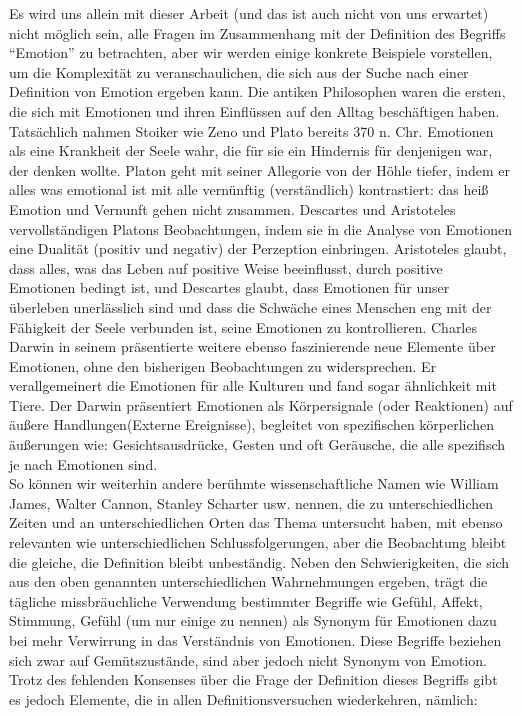 Es wird uns allein mit dieser Arbeit (und das ist auch nicht von uns erwartet) nicht m{\"o}glich sein, alle Fragen im Zusammenhang mit der Definition des Begriffs ``Emotion'' zu betrachten, aber wir werden einige konkrete Beispiele vorstellen, um die Komplexit{\"a}t zu veranschaulichen, die sich aus der Suche nach einer Definition von Emotion ergeben kann.  
Die antiken Philosophen\cite{geslin13} waren die ersten, die sich mit Emotionen und ihren Einfl{\"u}ssen auf den Alltag besch{\"a}ftigen haben. 
Tats{\"a}chlich nahmen Stoiker wie Zeno und Plato bereits 370 n. Chr. Emotionen als eine Krankheit der Seele wahr, die f{\"u}r sie ein Hindernis f{\"u}r denjenigen war, der denken wollte. 
Platon geht mit seiner Allegorie von der H{\"o}hle tiefer, indem er alles was emotional ist  mit alle vern{\"u}nftig (verst{\"a}ndlich) kontrastiert: das hei{\ss} Emotion und Vernunft gehen nicht zusammen. 
Descartes und Aristoteles vervollst{\"a}ndigen Platons Beobachtungen, indem sie in die Analyse von Emotionen eine Dualit{\"a}t (positiv und negativ) der Perzeption einbringen. 
Aristoteles glaubt, dass alles, was das Leben auf positive Weise beeinflusst, durch positive Emotionen bedingt ist, und Descartes glaubt, dass Emotionen f{\"u}r unser {\"u}berleben unerl{\"a}sslich sind und dass die Schw{\"a}che eines Menschen eng mit der F{\"a}higkeit der Seele verbunden ist, seine Emotionen zu kontrollieren. 
Charles Darwin in seinem pr{\"a}sentierte weitere ebenso faszinierende neue Elemente {\"u}ber Emotionen, ohne den bisherigen Beobachtungen zu widersprechen\cite{darwin1872}. 
Er verallgemeinert die Emotionen f{\"u}r alle Kulturen und fand sogar {\"a}hnlichkeit mit Tiere. 
Der Darwin pr{\"a}sentiert  Emotionen  als K{\"o}rpersignale (oder Reaktionen) auf {\"a}u{\ss}ere Handlungen(Externe Ereignisse), begleitet von spezifischen k{\"o}rperlichen {\"a}u{\ss}erungen wie: Gesichtsausdr{\"u}cke, Gesten und oft Ger{\"a}usche, die alle  spezifisch je nach Emotionen sind. \\


So k{\"o}nnen wir weiterhin andere ber{\"u}hmte wissenschaftliche Namen wie William James\cite{james1884}, Walter Cannon\cite{cannon32}, Stanley Scharter\cite{schachter59} usw. nennen, die zu unterschiedlichen Zeiten und an unterschiedlichen Orten das Thema untersucht haben, mit ebenso relevanten wie unterschiedlichen Schlussfolgerungen, aber die Beobachtung bleibt die gleiche, die Definition bleibt unbest{\"a}ndig.
Neben den Schwierigkeiten, die sich aus den oben genannten unterschiedlichen Wahrnehmungen ergeben, tr{\"a}gt die  t{\"a}gliche missbr{\"a}uchliche Verwendung bestimmter Begriffe wie Gef{\"u}hl, Affekt, Stimmung, Gef{\"u}hl (um nur einige zu nennen) als Synonym f{\"u}r Emotionen dazu bei  mehr Verwirrung in das Verst{\"a}ndnis von Emotionen. Diese Begriffe beziehen sich zwar auf Gem{\"u}tszust{\"a}nde, sind aber jedoch nicht Synonym von Emotion\cite{plamper12}.
Trotz des fehlenden Konsenses {\"u}ber die Frage der Definition dieses Begriffs gibt es jedoch Elemente, die in allen Definitionsversuchen wiederkehren, n{\"a}mlich: 

